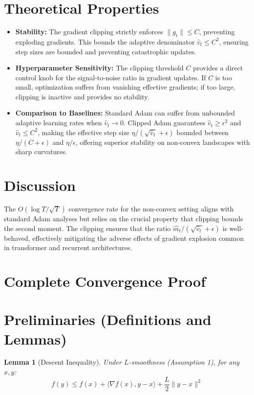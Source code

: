 \documentclass{article}
\newtheorem{lemma}[theorem]{Lemma}
\begin{document}
\section*{Theoretical Properties}
\begin{itemize}
\item \textbf{Stability:} The gradient clipping strictly enforces $\|g_t\| \leq C$, preventing exploding gradients. This bounds the adaptive denominator $\hat{v}_t \leq C^2$, ensuring step sizes are bounded and preventing catastrophic updates.
\item \textbf{Hyperparameter Sensitivity:} The clipping threshold $C$ provides a direct control knob for the signal-to-noise ratio in gradient updates. If $C$ is too small, optimization suffers from vanishing effective gradients; if too large, clipping is inactive and provides no stability.
\item \textbf{Comparison to Baselines:} Standard Adam can suffer from unbounded adaptive learning rates when $\hat{v}_t \to 0$. Clipped Adam guarantees $\hat{v}_t \geq \epsilon^2$ and $\hat{v}_t \leq C^2$, making the effective step size $\eta / (\sqrt{\hat{v}_t} + \epsilon)$ bounded between $\eta / (C + \epsilon)$ and $\eta / \epsilon$, offering superior stability on non-convex landscapes with sharp curvatures.
\end{itemize}

\section*{Discussion}
The $O(\log T / \sqrt{T})$ convergence rate for the non-convex setting aligns with standard Adam analyses but relies on the crucial property that clipping bounds the second moment. The clipping ensures that the ratio $\hat{m}_t / (\sqrt{\hat{v}_t} + \epsilon)$ is well-behaved, effectively mitigating the adverse effects of gradient explosion common in transformer and recurrent architectures.

\section*{Complete Convergence Proof}

\section*{Preliminaries (Definitions and Lemmas)}
\begin{lemma}[Descent Inequality]
Under $L$-smoothness (Assumption 1), for any $x, y$:
$$
f(y) \leq f(x) + \langle \nabla f(x), y - x \rangle + \frac{L}{2} \|y - x\|^2
$$
\end{lemma}
\end{document}
